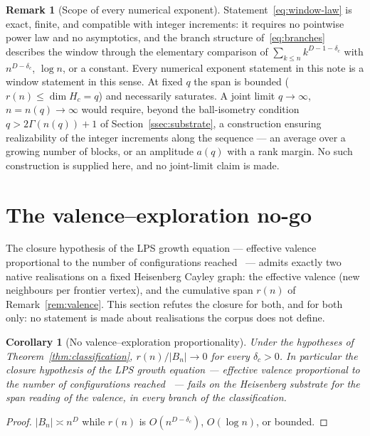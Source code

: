 \documentclass[11pt,a4paper]{article}
\newtheorem{corollary}[theorem]{Corollary}
\theoremstyle{definition}
\newtheorem{remark}[theorem]{Remark}
\newcommand{\dc}{\delta_c}
\begin{document}
\begin{remark}[Scope of every numerical exponent]
  \label{rem:window-scope}
  Statement~\eqref{eq:window-law} is exact, finite, and compatible with integer increments: it requires no
  pointwise power law and no asymptotics, and the branch structure of~\eqref{eq:branches} describes the
  window through the elementary comparison of $\sum_{k \le n} k^{D-1-\dc}$ with $n^{D-\dc}$, $\log n$, or a
  constant.
  Every numerical exponent statement in this note is a window statement in this sense.
  At fixed $q$ the span is bounded ($r(n) \le \dim H_c = q$) and necessarily saturates.
  A joint limit $q \to \infty$, $n = n(q) \to \infty$ would require, beyond the ball-isometry condition
  $q > 2\Gamma(n(q)) + 1$ of Section~\ref{ssec:substrate}, a construction ensuring realizability of the
  integer increments along the sequence --- an average over a growing number of blocks, or an amplitude
  $a(q)$ with a rank margin.
  No such construction is supplied here, and no joint-limit claim is made.
\end{remark}

\section{The valence--exploration no-go}
\label{sec:nogo}

The closure hypothesis of the LPS growth equation --- effective valence proportional to the number of
configurations reached~\cite{Beau2026a8} --- admits exactly two native realisations on a fixed Heisenberg
Cayley graph: the effective valence (new neighbours per frontier vertex), and the cumulative span $r(n)$ of
Remark~\ref{rem:valence}.
This section refutes the closure for both, and for both only: no statement is made about realisations the
corpus does not define.

\begin{corollary}[No valence--exploration proportionality]
  \label{cor:t1}
  Under the hypotheses of Theorem~\ref{thm:classification}, $r(n)/|B_n| \to 0$ for every $\dc > 0$.
  In particular the closure hypothesis of the LPS growth equation --- effective valence proportional to the
  number of configurations reached~\cite{Beau2026a8} --- fails on the Heisenberg substrate for the span
  reading of the valence, in every branch of the classification.
\end{corollary}

\begin{proof}
  $|B_n| \asymp n^D$ while $r(n)$ is $O(n^{D-\dc})$, $O(\log n)$, or bounded.
\end{proof}
\end{document}
